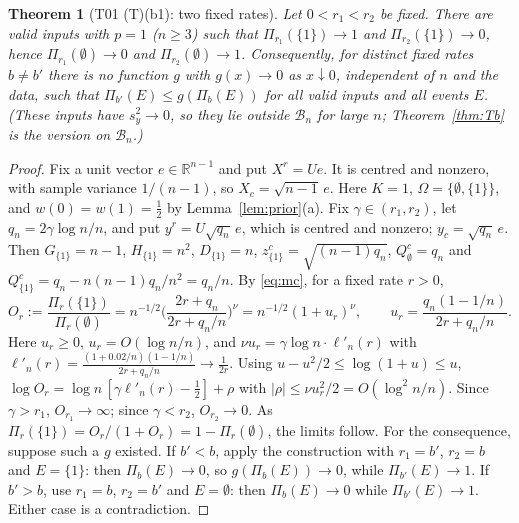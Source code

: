 \documentclass[11pt]{article}
\newtheorem{theorem}{Theorem}[section]
\theoremstyle{remark}
\newcommand{\R}{\mathbb R}
\newcommand{\Om}{\Omega}
\newcommand{\B}{\mathcal B}
\newcommand{\sy}{s_y}
\newcommand{\yc}{y_c}
\newcommand{\Xc}{X_c}
\begin{document}
\begin{theorem}[T01 (T)(b1): two fixed rates]\label{thm:Tb1}
Let $0<r_1<r_2$ be fixed. There are valid inputs with $p=1$ ($n\ge3$) such that $\Pi_{r_1}(\{1\})\to1$ and $\Pi_{r_2}(\{1\})\to0$, hence $\Pi_{r_1}(\emptyset)\to0$ and $\Pi_{r_2}(\emptyset)\to1$. Consequently, for distinct fixed rates $b\ne b'$ there is no function $g$ with $g(x)\to0$ as $x\downarrow0$, independent of $n$ and the data, such that $\Pi_{b'}(E)\le g(\Pi_b(E))$ for all valid inputs and all events $E$. (These inputs have $\sy^2\to0$, so they lie outside $\B_n$ for large $n$; Theorem~\ref{thm:Tb} is the version on $\B_n$.)
\end{theorem}
\begin{proof}
Fix a unit vector $e\in\R^{n-1}$ and put $X^r=Ue$. It is centred and nonzero, with sample variance $1/(n-1)$, so $\Xc=\sqrt{n-1}\,e$. Here $K=1$, $\Om=\{\emptyset,\{1\}\}$, and $w(0)=w(1)=\frac12$ by Lemma~\ref{lem:prior}(a). Fix $\gamma\in(r_1,r_2)$, let $q_n=2\gamma\log n/n$, and put $y^r=U\sqrt{q_n}\,e$, which is centred and nonzero; $\yc=\sqrt{q_n}\,e$. Then $G_{\{1\}}=n-1$, $H_{\{1\}}=n^2$, $D_{\{1\}}=n$, $z^c_{\{1\}}=\sqrt{(n-1)q_n}$, $Q^c_\emptyset=q_n$ and $Q^c_{\{1\}}=q_n-n(n-1)q_n/n^2=q_n/n$. By \eqref{eq:mc}, for a fixed rate $r>0$,
\[
O_r:=\frac{\Pi_r(\{1\})}{\Pi_r(\emptyset)}=n^{-1/2}\Big(\frac{2r+q_n}{2r+q_n/n}\Big)^\nu=n^{-1/2}(1+u_r)^\nu,\qquad u_r=\frac{q_n(1-1/n)}{2r+q_n/n}.
\]
Here $u_r\ge0$, $u_r=O(\log n/n)$, and $\nu u_r=\gamma\log n\cdot\ell'_n(r)$ with $\ell'_n(r)=\frac{(1+0.02/n)(1-1/n)}{2r+q_n/n}\to\frac1{2r}$. Using $u-u^2/2\le\log(1+u)\le u$, $\log O_r=\log n\,[\gamma\ell'_n(r)-\frac12]+\rho$ with $|\rho|\le\nu u_r^2/2=O(\log^2n/n)$. Since $\gamma>r_1$, $O_{r_1}\to\infty$; since $\gamma<r_2$, $O_{r_2}\to0$. As $\Pi_r(\{1\})=O_r/(1+O_r)=1-\Pi_r(\emptyset)$, the limits follow. For the consequence, suppose such a $g$ existed. If $b'<b$, apply the construction with $r_1=b'$, $r_2=b$ and $E=\{1\}$: then $\Pi_b(E)\to0$, so $g(\Pi_b(E))\to0$, while $\Pi_{b'}(E)\to1$. If $b'>b$, use $r_1=b$, $r_2=b'$ and $E=\emptyset$: then $\Pi_b(E)\to0$ while $\Pi_{b'}(E)\to1$. Either case is a contradiction.
\end{proof}
\end{document}
